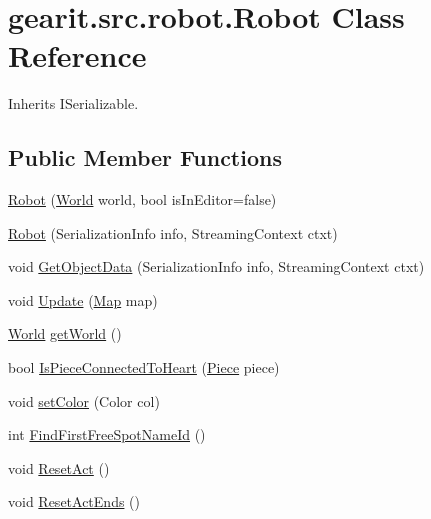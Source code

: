 \hypertarget{classgearit_1_1src_1_1robot_1_1_robot}{\section{gearit.\+src.\+robot.\+Robot Class Reference}
\label{classgearit_1_1src_1_1robot_1_1_robot}
}


Inherits I\+Serializable.

\subsection*{Public Member Functions}
\begin{DoxyCompactItemize}
\item 
\hyperlink{classgearit_1_1src_1_1robot_1_1_robot_a7ac841c500d5ed51a26f3f9b401a9af2}{Robot} (\hyperlink{class_farseer_physics_1_1_dynamics_1_1_world}{World} world, bool is\+In\+Editor=false)
\item 
\hyperlink{classgearit_1_1src_1_1robot_1_1_robot_a7e4a423fc72103f28c3ca9cc3539ddde}{Robot} (Serialization\+Info info, Streaming\+Context ctxt)
\item 
void \hyperlink{classgearit_1_1src_1_1robot_1_1_robot_ac3300f022e8744f7355fa8b6871ac062}{Get\+Object\+Data} (Serialization\+Info info, Streaming\+Context ctxt)
\item 
void \hyperlink{classgearit_1_1src_1_1robot_1_1_robot_ad5de51386732d800c61deccabcc89347}{Update} (\hyperlink{classgearit_1_1src_1_1map_1_1_map}{Map} map)
\item 
\hyperlink{class_farseer_physics_1_1_dynamics_1_1_world}{World} \hyperlink{classgearit_1_1src_1_1robot_1_1_robot_a4ea8eaa66196979faebb1a48a076344a}{get\+World} ()
\item 
bool \hyperlink{classgearit_1_1src_1_1robot_1_1_robot_a27dbdffbcf378ab3a2c2fd6d57dd0c6f}{Is\+Piece\+Connected\+To\+Heart} (\hyperlink{classgearit_1_1src_1_1robot_1_1_piece}{Piece} piece)
\item 
void \hyperlink{classgearit_1_1src_1_1robot_1_1_robot_a855521f4c7b3e9b0110edb3537cefe60}{set\+Color} (Color col)
\item 
int \hyperlink{classgearit_1_1src_1_1robot_1_1_robot_a0315628bee2f0f165dee7b15b953a9a6}{Find\+First\+Free\+Spot\+Name\+Id} ()
\item 
void \hyperlink{classgearit_1_1src_1_1robot_1_1_robot_a3ecb7905e465c75103a8edac57c0d4d7}{Reset\+Act} ()
\item 
void \hyperlink{classgearit_1_1src_1_1robot_1_1_robot_afd1c0225d88394c44aa341051924d771}{Reset\+Act\+Ends} ()

\end{DoxyCompactItemize}
